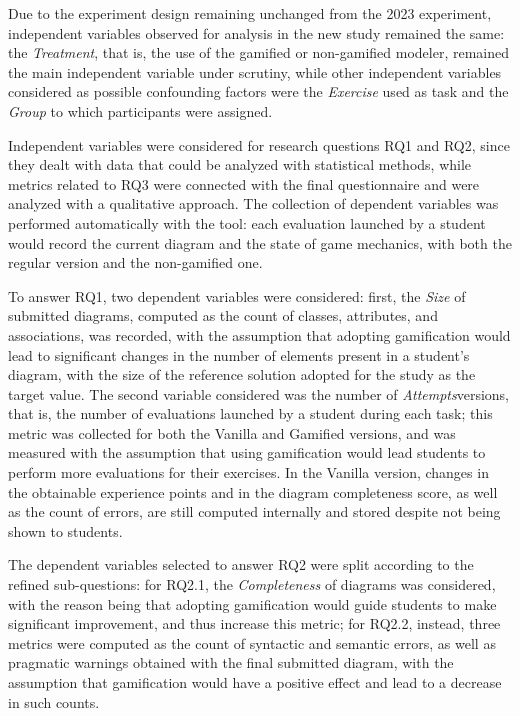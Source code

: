 Due to the experiment design remaining unchanged from the 2023 experiment, independent variables observed for analysis in the new study remained the same: the \textit{Treatment}, that is, the use of the gamified or non-gamified modeler, remained the main independent variable under scrutiny, while other independent variables considered as possible confounding factors were the \textit{Exercise} used as task and the \textit{Group} to which participants were assigned.

Independent variables were considered for research questions RQ1 and RQ2, since they dealt with data that could be analyzed with statistical methods, while metrics related to RQ3 were connected with the final questionnaire and were analyzed with a qualitative approach. The collection of dependent variables was performed automatically with the tool: each evaluation launched by a student would record the current diagram and the state of game mechanics, with both the regular version and the non-gamified one. 

To answer RQ1, two dependent variables were considered: first, the \textit{Size} of submitted diagrams, computed as the count of classes, attributes, and associations, was recorded, with the assumption that adopting gamification would lead to significant changes in the number of elements present in a student's diagram, with the size of the reference solution adopted for the study as the target value. The second variable considered was the number of \textit{Attempts}versions, that is, the number of evaluations launched by a student during each task; this metric was collected for both the Vanilla and Gamified versions, and was measured with the assumption that using gamification would lead students to perform more evaluations for their exercises. In the Vanilla version, changes in the obtainable experience points and in the diagram completeness score, as well as the count of errors, are still computed internally and stored despite not being shown to students.


The dependent variables selected to answer RQ2 were split according to the refined sub-questions: for RQ2.1, the \textit{Completeness} of diagrams was considered, with the reason being that adopting gamification would guide students to make significant improvement, and thus increase this metric; for RQ2.2, instead, three metrics were computed as the count of syntactic and semantic errors, as well as pragmatic warnings obtained with the final submitted diagram, with the assumption that gamification would have a positive effect and lead to a decrease in such counts.

